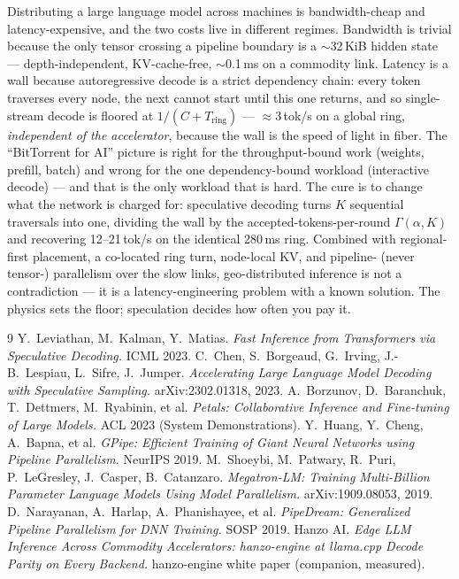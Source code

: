 \documentclass[11pt]{article}
\newcommand{\Tring}{\ensuremath{T_{\mathrm{ring}}}}
\newcommand{\Gam}{\ensuremath{\Gamma}}
\begin{document}
Distributing a large language model across machines is bandwidth-cheap and latency-expensive, and
the two costs live in different regimes. Bandwidth is trivial because the only tensor crossing a
pipeline boundary is a $\sim$32\,KiB hidden state --- depth-independent, KV-cache-free,
$\sim$0.1\,ms on a commodity link. Latency is a wall because autoregressive decode is a strict
dependency chain: every token traverses every node, the next cannot start until this one returns,
and so single-stream decode is floored at $1/(C+\Tring)$ --- $\approx$3\,tok/s on a global ring,
\emph{independent of the accelerator}, because the wall is the speed of light in fiber. The
``BitTorrent for AI'' picture is right for the throughput-bound work (weights, prefill, batch) and
wrong for the one dependency-bound workload (interactive decode) --- and that is the only workload
that is hard. The cure is to change what the network is charged for: speculative decoding turns $K$
sequential traversals into one, dividing the wall by the accepted-tokens-per-round $\Gam(\alpha,K)$
and recovering 12--21\,tok/s on the identical 280\,ms ring. Combined with regional-first placement, a
co-located ring turn, node-local KV, and pipeline- (never tensor-) parallelism over the slow links,
geo-distributed inference is not a contradiction --- it is a latency-engineering problem with a known
solution. The physics sets the floor; speculation decides how often you pay it.

\begin{thebibliography}{9}
\small
{} Y.~Leviathan, M.~Kalman, Y.~Matias.
\emph{Fast Inference from Transformers via Speculative Decoding.} ICML 2023.
 C.~Chen, S.~Borgeaud, G.~Irving, J.-B.~Lespiau, L.~Sifre, J.~Jumper.
\emph{Accelerating Large Language Model Decoding with Speculative Sampling.} arXiv:2302.01318, 2023.
 A.~Borzunov, D.~Baranchuk, T.~Dettmers, M.~Ryabinin, et al.
\emph{Petals: Collaborative Inference and Fine-tuning of Large Models.} ACL 2023 (System Demonstrations).
 Y.~Huang, Y.~Cheng, A.~Bapna, et al.
\emph{GPipe: Efficient Training of Giant Neural Networks using Pipeline Parallelism.} NeurIPS 2019.
 M.~Shoeybi, M.~Patwary, R.~Puri, P.~LeGresley, J.~Casper, B.~Catanzaro.
\emph{Megatron-LM: Training Multi-Billion Parameter Language Models Using Model Parallelism.}
arXiv:1909.08053, 2019.
 D.~Narayanan, A.~Harlap, A.~Phanishayee, et al.
\emph{PipeDream: Generalized Pipeline Parallelism for DNN Training.} SOSP 2019.
 Hanzo AI. \emph{Edge LLM Inference Across Commodity Accelerators: hanzo-engine at
llama.cpp Decode Parity on Every Backend.} hanzo-engine white paper (companion, measured).
\end{thebibliography}
\end{document}
